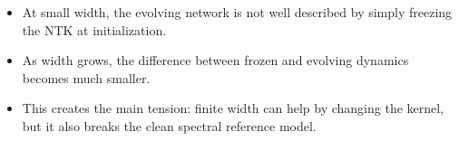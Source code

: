 \documentclass[aspectratio=169,9pt]{beamer}
\newcommand{\tightlist}{\setlength\itemsep{1.3pt}\setlength\parskip{0pt}\setlength\parsep{0pt}}
\begin{document}
\begin{frame}
	\vspace{1.5mm}
	\begin{bluecard}
		\begin{itemize}\tightlist\scriptsize
			\item At small width, the evolving network is not well described by simply freezing the NTK at initialization.
			\item As width grows, the difference between frozen and evolving dynamics becomes much smaller.
			\item This creates the main tension: finite width can help by changing the kernel, but it also breaks the clean spectral reference model.
		\end{itemize}
	\end{bluecard}
\end{frame}
\end{document}
